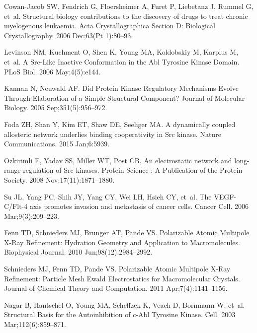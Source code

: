 \documentclass[10pt,letterpaper]{article}
\begin{document}
\begin{thebibliography}{100}
Cowan-Jacob SW, Fendrich G, Floersheimer A, Furet P, Liebetanz J, Rummel G,
  et~al.
\newblock Structural biology contributions to the discovery of drugs to treat
  chronic myelogenous leukaemia.
\newblock Acta Crystallographica Section D: Biological Crystallography. 2006
  Dec;63(Pt 1):80--93.

Levinson NM, Kuchment O, Shen K, Young MA, Koldobskiy M, Karplus M, et~al.
\newblock A {Src}-{Like} {Inactive} {Conformation} in the {Abl} {Tyrosine}
  {Kinase} {Domain}.
\newblock PLoS Biol. 2006 May;4(5):e144.

Kannan N, Neuwald AF.
\newblock Did {Protein} {Kinase} {Regulatory} {Mechanisms} {Evolve} {Through}
  {Elaboration} of a {Simple} {Structural} {Component}?
\newblock Journal of Molecular Biology. 2005 Sep;351(5):956--972.

Foda ZH, Shan Y, Kim ET, Shaw DE, Seeliger MA.
\newblock A dynamically coupled allosteric network underlies binding
  cooperativity in {Src} kinase.
\newblock Nature Communications. 2015 Jan;6:5939.

Ozkirimli E, Yadav SS, Miller WT, Post CB.
\newblock An electrostatic network and long-range regulation of {Src} kinases.
\newblock Protein Science : A Publication of the Protein Society. 2008
  Nov;17(11):1871--1880.

Su JL, Yang PC, Shih JY, Yang CY, Wei LH, Hsieh CY, et~al.
\newblock The {VEGF}-{C}/{Flt}-4 axis promotes invasion and metastasis of
  cancer cells.
\newblock Cancer Cell. 2006 Mar;9(3):209--223.

Fenn TD, Schnieders MJ, Brunger AT, Pande VS.
\newblock Polarizable {Atomic} {Multipole} {X}-{Ray} {Refinement}: {Hydration}
  {Geometry} and {Application} to {Macromolecules}.
\newblock Biophysical Journal. 2010 Jun;98(12):2984--2992.

Schnieders MJ, Fenn TD, Pande VS.
\newblock Polarizable {Atomic} {Multipole} {X}-{Ray} {Refinement}: {Particle}
  {Mesh} {Ewald} {Electrostatics} for {Macromolecular} {Crystals}.
\newblock Journal of Chemical Theory and Computation. 2011 Apr;7(4):1141--1156.

Nagar B, Hantschel O, Young MA, Scheffzek K, Veach D, Bornmann W, et~al.
\newblock Structural {Basis} for the {Autoinhibition} of c-{Abl} {Tyrosine}
  {Kinase}.
\newblock Cell. 2003 Mar;112(6):859--871.


\end{thebibliography}
\end{document}
